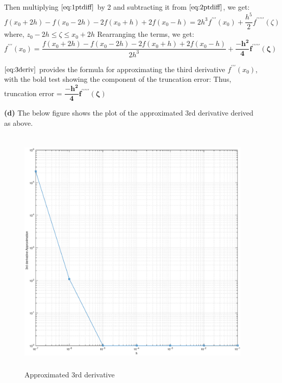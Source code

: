 \documentclass{article}
\renewcommand\part[1]{\vspace{.10in}\textbf{(#1)}}
\begin{document}
  Then multiplying $\eqref{eq:1ptdiff}$ by 2 and subtracting it from $\eqref{eq:2ptdiff}$, we get:
  \[ f(x_0 + 2h) - f(x_0 - 2h) - 2f(x_0 + h) + 2f(x_0-h) = 2h^3f^{\prime\prime\prime}(x_0) + \dfrac{h^5}{2}f^{\prime\prime\prime\prime\prime}(\zeta) \]
  where, $z_0 - 2h \leq \zeta \leq x_0 + 2h$
  Rearranging the terms, we get:
  \begin{equation}
	  f^{\prime\prime\prime}(x_0) = \dfrac{f(x_0 + 2h) - f(x_0 - 2h) - 2f(x_0 + h) + 2f(x_0-h)}{2h^3} + \mathbf{\dfrac{-h^2}{4}f^{\prime\prime\prime\prime\prime}(\zeta)}
	  \label{eq:3deriv}
  \end{equation}

  $\eqref{eq:3deriv}$ provides the formula for approximating the third derivative $f^{\prime\prime\prime}(x_0)$, with the bold test showing the component of the truncation error:
  Thus, truncation error = $\mathbf{\dfrac{-h^2}{4}f^{\prime\prime\prime\prime\prime}(\zeta)}$

  \part{d} The below figure shows the plot of the approximated 3rd derivative derived as above.
  \begin{figure}[H]
   \centering
  \includegraphics[width=12cm, height=12cm]{Prob2}
  \caption{Approximated 3rd derivative}
  \end{figure}
  
\end{document}

